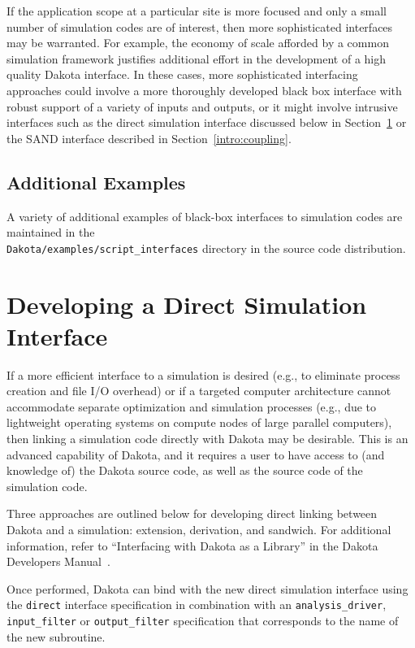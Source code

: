 If the application scope at a particular site is more focused and only
a small number of simulation codes are of interest, then more
sophisticated interfaces may be warranted. For example, the economy of
scale afforded by a common simulation framework justifies additional
effort in the development of a high quality Dakota interface. In these
cases, more sophisticated interfacing approaches could involve a more
thoroughly developed black box interface with robust support of a
variety of inputs and outputs, or it might involve intrusive
interfaces such as the direct simulation interface discussed below in
Section~\ref{advint:direct} or the SAND interface described in
Section~\ref{intro:coupling}.

\subsection{Additional Examples}

A variety of additional examples of black-box interfaces to simulation
codes are maintained in the\\
\texttt{Dakota/examples/script\_interfaces} directory in the source
code distribution.


\section{Developing a Direct Simulation Interface}\label{advint:direct}

If a more efficient interface to a simulation is desired (e.g., to
eliminate process creation and file I/O overhead) or if a targeted
computer architecture cannot accommodate separate optimization and
simulation processes (e.g., due to lightweight operating systems on
compute nodes of large parallel computers), then linking a simulation
code directly with Dakota may be desirable. This is an advanced
capability of Dakota, and it requires a user to have access to (and
knowledge of) the Dakota source code, as well as the source code of
the simulation code.

Three approaches are outlined below for developing direct linking
between Dakota and a simulation: extension, derivation, and
sandwich. For additional information, refer to ``Interfacing with
Dakota as a Library'' in the Dakota Developers Manual~\cite{DevMan}.

Once performed, Dakota can bind with the new direct simulation
interface using the \texttt{direct} interface specification in
combination with an \texttt{analysis\_driver}, \texttt{input\_filter}
or \texttt{output\_filter} specification that corresponds to the name
of the new subroutine.

